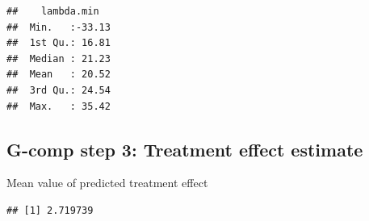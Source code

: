 \documentclass[
]{book}
\newenvironment{Shaded}{\begin{snugshade}}{\end{snugshade}}
\newcommand{\AttributeTok}[1]{\textcolor[rgb]{0.77,0.63,0.00}{#1}}
\newcommand{\DecValTok}[1]{\textcolor[rgb]{0.00,0.00,0.81}{#1}}
\newcommand{\FunctionTok}[1]{\textcolor[rgb]{0.00,0.00,0.00}{#1}}
\newcommand{\NormalTok}[1]{#1}
\newcommand{\OtherTok}[1]{\textcolor[rgb]{0.56,0.35,0.01}{#1}}
\newcommand{\SpecialCharTok}[1]{\textcolor[rgb]{0.00,0.00,0.00}{#1}}
\newcommand{\StringTok}[1]{\textcolor[rgb]{0.31,0.60,0.02}{#1}}
\begin{document}
\begin{Shaded}
\end{Shaded}

\begin{verbatim}
##    lambda.min    
##  Min.   :-33.13  
##  1st Qu.: 16.81  
##  Median : 21.23  
##  Mean   : 20.52  
##  3rd Qu.: 24.54  
##  Max.   : 35.42
\end{verbatim}

\hypertarget{g-comp-step-3-treatment-effect-estimate}{%
\subsection{G-comp step 3: Treatment effect estimate}\label{g-comp-step-3-treatment-effect-estimate}}

\begin{Shaded}
\end{Shaded}

Mean value of predicted treatment effect

\begin{Shaded}
\end{Shaded}

\begin{verbatim}
## [1] 2.719739
\end{verbatim}

\begin{Shaded}
\end{Shaded}
\end{document}
